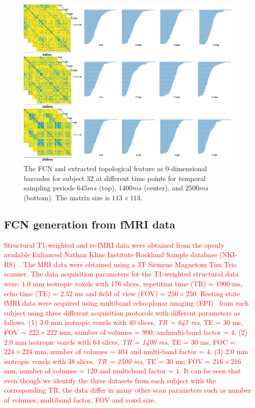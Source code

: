 \begin{figure}[t]%
	\centering	
	\includegraphics[width=1\textwidth, trim={0cm, 0.0cm, 0.0cm, 0.0cm}]{figures/stacked.png}
	\caption{The FCN and extracted topological feature as 0-dimensional barcodes for subject $32$ at different time points for temporal sampling periods $645ms$ (top), $1400ms$ (center), and $2500ms$ (bottom). The matrix size is $113 \times 113$.}
	\label{fig:wd1}
\end{figure}

\subsection{FCN generation from fMRI data}
\label{sec:fmri_to_fcn}
\textcolor{red}{
Structural T1-weighted and rs-fMRI data were obtained from the openly available Enhanced Nathan Kline Institute Rockland Sample database (NKI-RS)~\cite{nooner2012nki}. 
The MRI data were obtained using a 3T Siemens Magnetom Tim Trio scanner. 
The data acquisition parameters for the T1-weighted structural data were: $1.0$ mm isotropic voxels with 176 slices, 
repetition time (TR) = $1900$ ms,
echo time (TE) = $2.52$ ms and field of view (FOV) = $250 \times 250$.
Resting state fMRI data were acquired using multiband echo-planar imaging (EPI)~\cite{feinberg2010multiplexed} from each subject using three different acquisition protocols with different parameters as follows. 
(1) $3.0$ mm isotropic voxels with $40$ slices, \emph{TR = 645 ms}, TE = $30$ ms, FOV = $222 \times 222$ mm, number of volumes = $900$, andmulti-band factor = $4$.
(2) $2.0$ mm isotropic voxels with $64$ silces, \emph{TR = 1400 ms}, TE = $30$ ms, FOC = $224 \times 224$ mm, number of volumes = $404$ and multi-band factor = $4$. (3)
$2.0$ mm isotropic voxels with 38 slices, \emph{TR = 2500 ms}, TE = $30$ ms; FOV = $216 \times 216$ mm, number of volumes = $120$ and multi-band factor = $1$.
It can be seen that even though we identify the three datasets from each subject with the corresponding TR, the data differ in many other scan parameters such as number of volumes, multiband factor, FOV and voxel size.
}

